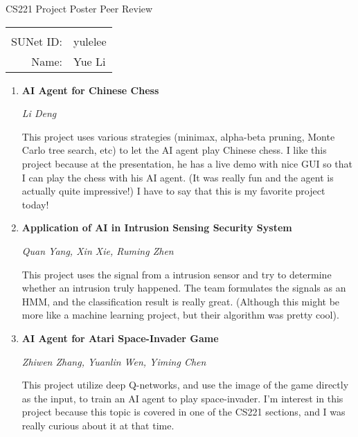 \documentclass[12pt]{article}
\begin{document}
\begin{center}
{\Large CS221 Project Poster Peer Review}

\begin{tabular}{rl}
\newline
\\ 
SUNet ID: & yulelee \\
Name: & Yue Li \\
\end{tabular}
\end{center}

\begin{enumerate}[label=(\roman*)]
    \item \textbf{AI Agent for Chinese Chess}
    \par
    \textit{Li Deng}
    \par
    This project uses various strategies (minimax, alpha-beta pruning, Monte Carlo tree search, etc) to let the AI agent play Chinese chess. I like this project because at the presentation, he has a live demo with nice GUI so that I can play the chess with his AI agent. (It was really fun and the agent is actually quite impressive!) I have to say that this is my favorite project today!
    \item 
    \textbf{Application of AI in Intrusion Sensing Security System}
    \par
    \textit{Quan Yang, Xin Xie, Ruming Zhen}
    \par
    This project uses the signal from a intrusion sensor and try to determine whether
    an intrusion truly happened. The team formulates the signals as an HMM, and the 
    classification result is really great. (Although this might be more like a machine learning project, but their algorithm was pretty cool).
    
    \item
    \textbf{AI Agent for Atari Space-Invader Game}
    \par
    \textit{Zhiwen Zhang, Yuanlin Wen, Yiming Chen}
    \par
    This project utilize deep Q-networks, and use the image of the game directly 
    as the input, to train an AI agent to play space-invader. I'm interest in this
    project because this topic is covered in one of the CS221 sections, 
    and I was really 
    curious about it at that time.
    
    
\end{enumerate}
\end{document}
